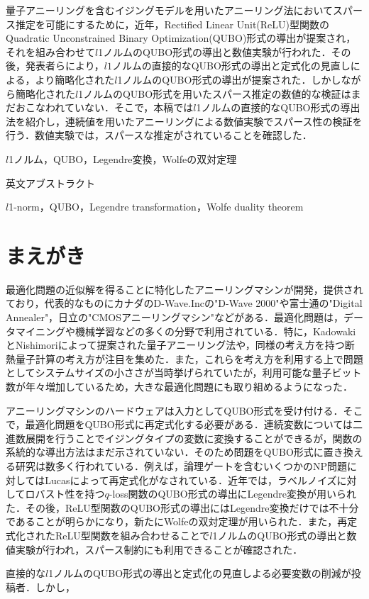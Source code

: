 \documentclass[technicalreport]{ieicej}
\begin{document}
\begin{jabstract}
  量子アニーリングを含むイジングモデルを用いたアニーリング法においてスパース推定を可能にするために，近年，Rectified Linear Unit(ReLU)型関数のQuadratic Unconstrained Binary Optimization(QUBO)形式の導出が提案され，それを組み合わせて$l$1ノルムのQUBO形式の導出と数値実験が行われた．その後，発表者らにより，$l1$ノルムの直接的なQUBO形式の導出と定式化の見直しによる，より簡略化された$l$1ノルムのQUBO形式の導出が提案された．しかしながら簡略化された$l$1ノルムのQUBO形式を用いたスパース推定の数値的な検証はまだおこなわれていない．そこで，本稿では$l$1ノルムの直接的なQUBO形式の導出法を紹介し，連続値を用いたアニーリングによる数値実験でスパース性の検証を行う．数値実験では，スパースな推定がされていることを確認した．
\end{jabstract}
\begin{jkeyword}
$l$1ノルム，QUBO，Legendre変換，Wolfeの双対定理
\end{jkeyword}
\begin{eabstract}
英文アブストラクト
\end{eabstract}
\begin{ekeyword}
$l$1-norm，QUBO，Legendre transformation，Wolfe duality theorem
\end{ekeyword}
\maketitle

\section{まえがき}
最適化問題の近似解を得ることに特化したアニーリングマシンが開発，提供されており，代表的なものにカナダのD-Wave.Inc\cite{d-wave01,d-wave02}の"D-Wave 2000"や富士通\cite{Digital_annealer}の"Digital Annealer"，日立の"CMOSアニーリングマシン"などがある．最適化問題は，データマイニングや機械学習などの多くの分野で利用されている．特に，KadowakiとNishimoriによって提案された量子アニーリング法\cite{Quantum_annealing}や，同様の考え方を持つ断熱量子計算\cite{AQC}の考え方が注目を集めた．また，これらを考え方を利用する上で問題としてシステムサイズの小ささが当時挙げられていたが，利用可能な量子ビット数が年々増加しているため，大きな最適化問題にも取り組めるようになった．

アニーリングマシンのハードウェアは入力としてQUBO形式を受け付ける．そこで，最適化問題をQUBO形式に再定式化する必要がある．連続変数については二進数展開を行うことでイジングタイプの変数に変換することができるが，関数の系統的な導出方法はまだ示されていない．そのため問題をQUBO形式に置き換える研究は数多く行われている．例えば，論理ゲートを含むいくつかのNP問題に対してはLucasによって再定式化がなされている\cite{logic_gate,formulation}．近年では，ラベルノイズに対してロバスト性を持つ$q$-loss関数のQUBO形式の導出にLegendre変換が用いられた\cite{q-loss_formulation}．その後，ReLU型関数のQUBO形式の導出\cite{ReLU_function}にはLegendre変換だけでは不十分であることが明らかになり，新たにWolfeの双対定理\cite{Wolfe_duality}が用いられた．また，再定式化されたReLU型関数を組み合わせることで$l$1ノルムのQUBO形式の導出と数値実験が行われ，スパース制約にも利用できることが確認された\cite{ReLU_simmulate}．

直接的な$l$1ノルムのQUBO形式の導出と定式化の見直しよる必要変数の削減が投稿者．しかし，


%
%
\begin{thebibliography}{99}%
\bibitem{}
\end{thebibliography}
\end{document}
